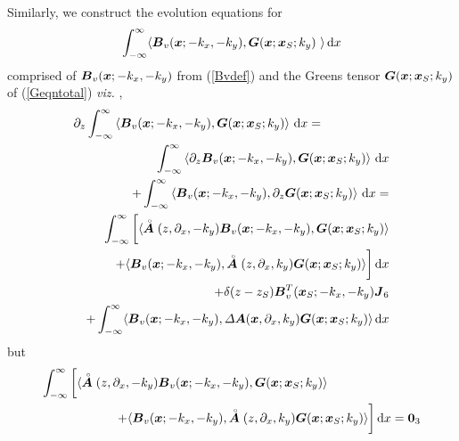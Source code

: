Similarly, we construct the evolution equations for 
\[
\int_{-\infty}^{\infty} \langle{\mbox{\boldmath$\mit B$\unboldmath}}_{v}({\mbox{\boldmath$\mit x$\unboldmath}};-k_x,-k_y), 
{\mbox{\boldmath$\mit G$\unboldmath}}({\mbox{\boldmath$\mit x$\unboldmath}} ; {\mbox{\boldmath$\mit x$\unboldmath}}_{ S};k_y)\ \rangle \, {\rm d}x
\]
 comprised
of ${\mbox{\boldmath$\mit B$\unboldmath}}_{v}({\mbox{\boldmath$\mit x$\unboldmath}};-k_x,-k_y)$ from (\ref{Bvdef})  
and the  Greens tensor ${\mbox{\boldmath$\mit G$\unboldmath}}({\mbox{\boldmath$\mit x$\unboldmath}} ; {\mbox{\boldmath$\mit x$\unboldmath}}_{ S};k_y)$ of 
(\ref{Geqntotal}) {\em viz. \/},
\begin{eqnarray} \label{(2.4.4)} 
\lefteqn{{\partial }_{z} \int_{-\infty}^{\infty} \left\langle{  {\bmi B}_{v}({\bmi x};-k_x,-k_y),  
{\bmi G}({\bmi  x} ; {\bmi  x}_{ S};k_y)
}\right\rangle \,{\rm d}x  =
}\nonumber\\
&&
\int_{-\infty}^{\infty} \left\langle{ {\partial }_{z}  {\bmi B}_{v}({\bmi x};-k_x,-k_y),  
{\bmi G}({\bmi  x} ; {\bmi  x}_{ S};k_y)
}\right\rangle \,{\rm d}x \nonumber\\
&&+
\int_{-\infty}^{\infty} \left\langle{   {\bmi B}_{v}({\bmi x};-k_x,-k_y),  
{\partial }_{z} {\bmi G}({\bmi  x} ; {\bmi  x}_{ S};k_y)
}\right\rangle \,{\rm d}x=\nonumber\\
&&
\int_{-\infty}^{\infty} \bigg[ \langle \rf{\bmi A}({z},{\partial}_{x}, -k_y) {\bmi B}_{v}({\bmi x};-k_x,-k_y),  
{\bmi G}({\bmi  x} ; {\bmi  x}_{ S};k_y) \rangle   \nonumber\\
&&
+\langle{\bmi B}_{v}({\bmi x};-k_x,-k_y), 
\rf{\bmi A}({z},{\partial}_{x}, k_y) {\bmi G}({\bmi  x} ; {\bmi  x}_{ S};k_y) 
\rangle\bigg]\,{\rm d}x\nonumber\\
&&
+ \delta (z-{z}_{S}) {\bmi B}{}_{v}^{T}({\bmi x}_{S};-k_x,-k_y)
{\bmi  J}_{6}  \nonumber\\
&&
+ 
\int_{-\infty}^{\infty} \langle{\bmi B}_{v}({\bmi x};-k_x,-k_y), {\mit \Delta}
{\bmi A}({\bmi x},{\partial}_{x}, k_y) {\bmi G}({\bmi  x} ; {\bmi  x}_{ S};k_y) \rangle \,{\rm d}x
\end{eqnarray} 
but
\begin{eqnarray} \label{Asym2}
\lefteqn{\int_{-\infty}^{\infty} \bigg[ \langle \rf{\bmi A}({z},{\partial}_{x}, -k_y) {\bmi B}_{v}({\bmi x};-k_x,-k_y),  
{\bmi G}({\bmi  x} ; {\bmi  x}_{ S};k_y) \rangle }  \nonumber\\
&&
\qquad\qquad\quad
+\langle{\bmi B}_{v}({\bmi x};-k_x,-k_y), 
\rf{\bmi A}({z},{\partial}_{x}, k_y) {\bmi G}({\bmi  x} ; {\bmi  x}_{ S};k_y) 
\rangle\bigg]\,{\rm d}x= {\bf 0}_3
\end{eqnarray}
